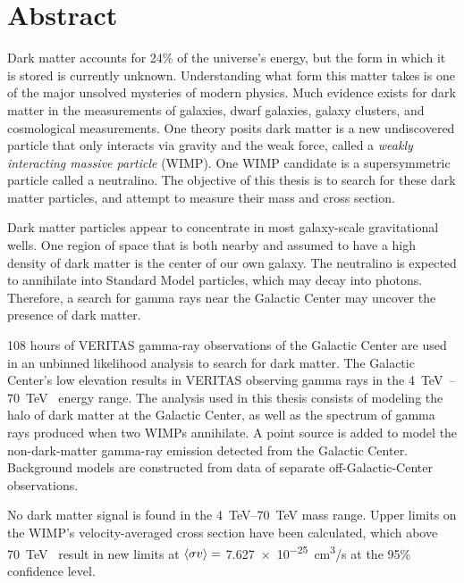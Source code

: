 \cleartooddpage[\thispagestyle{empty}]
\section*{Abstract}

Dark matter accounts for 24\% of the universe's energy, but the form in which it is stored is currently unknown.
Understanding what form this matter takes is one of the major unsolved mysteries of modern physics.
Much evidence exists for dark matter in the measurements of galaxies, dwarf galaxies, galaxy clusters, and cosmological measurements.
One theory posits dark matter is a new undiscovered particle that only interacts via gravity and the weak force, called a \textit{weakly interacting massive particle} (WIMP).
One WIMP candidate is a supersymmetric particle called a neutralino.
The objective of this thesis is to search for these dark matter particles, and attempt to measure their mass and cross section.

Dark matter particles appear to concentrate in most galaxy-scale gravitational wells.
One region of space that is both nearby and assumed to have a high density of dark matter is the center of our own galaxy.
The neutralino is expected to annihilate into Standard Model particles, which may decay into photons.
Therefore, a search for gamma rays near the Galactic Center may uncover the presence of dark matter.

108 hours of VERITAS gamma-ray observations of the Galactic Center are used in an unbinned likelihood analysis to search for dark matter.
The Galactic Center's low elevation results in VERITAS observing gamma rays in the \SIrange{4}{70}{\TeV{}} energy range.
The analysis used in this thesis consists of modeling the halo of dark matter at the Galactic Center, as well as the spectrum of gamma rays produced when two WIMPs annihilate.
A point source is added to model the non-dark-matter gamma-ray emission detected from the Galactic Center.
Background models are constructed from data of separate off-Galactic-Center observations.

No dark matter signal is found in the \SIrange{4}{70}{\TeV} mass range.
Upper limits on the WIMP's velocity-averaged cross section have been calculated, which above \SI{70}{\TeV{}} result in new limits at $\left \langle \sigma v \right \rangle =$ \SI{7.627e-25}{cm^3/s} at the 95\% confidence level.



\cleartoevenpage[\thispagestyle{plain}]
\null
